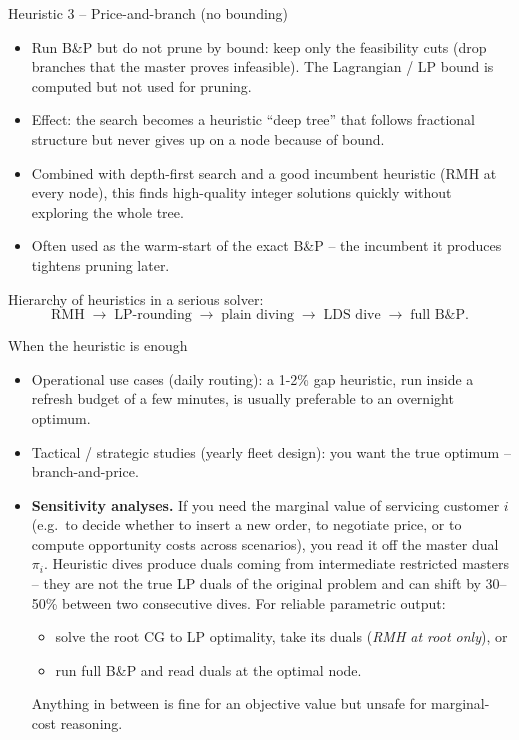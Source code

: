 \documentclass[10pt,aspectratio=169]{beamer}
\begin{document}
\begin{frame}{Heuristic 3 -- Price-and-branch (no bounding)}
  \begin{itemize}\small
    \item Run B\&P but \alert{do not prune by bound}: keep only the
          \alert{feasibility} cuts (drop branches that the master proves
          infeasible). The Lagrangian / LP bound is computed but not used
          for pruning.
    \item Effect: the search becomes a heuristic ``deep tree'' that follows
          fractional structure but never gives up on a node because of bound.
    \item Combined with depth-first search and a good incumbent heuristic
          (RMH at every node), this finds high-quality integer solutions
          quickly without exploring the whole tree.
    \item Often used as the warm-start of the exact B\&P -- the incumbent
          it produces tightens pruning later.
  \end{itemize}

  \medskip
  Hierarchy of heuristics in a serious solver:
  \[
    \text{RMH} \;\longrightarrow\; \text{LP-rounding}
                  \;\longrightarrow\; \text{plain diving}
                  \;\longrightarrow\; \text{LDS dive}
                  \;\longrightarrow\; \text{full B\&P}.
  \]
\end{frame}

\begin{frame}{When the heuristic is enough}
  \begin{itemize}\small
    \item Operational use cases (daily routing): a 1-2\% gap heuristic, run
          inside a refresh budget of a few minutes, is usually preferable to
          an overnight optimum.
    \item Tactical / strategic studies (yearly fleet design): you want the
          true optimum -- branch-and-price.
    \item \textbf{Sensitivity analyses.} If you need the marginal value of
          servicing customer $i$ (e.g.\ to decide whether to insert a new
          order, to negotiate price, or to compute opportunity costs across
          scenarios), you read it off the master dual $\pi_i$. Heuristic
          dives produce duals coming from intermediate restricted masters --
          they are \alert{not} the true LP duals of the original problem
          and can shift by 30--50\% between two consecutive dives. For
          reliable parametric output:
          \begin{itemize}\scriptsize
            \item solve the root CG to LP optimality, take its duals
                  (\emph{RMH at root only}), or
            \item run full B\&P and read duals at the optimal node.
          \end{itemize}
          Anything in between is fine for an objective value but unsafe for
          marginal-cost reasoning.
  \end{itemize}
\end{frame}
\end{document}
